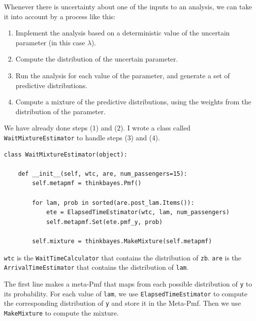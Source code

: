 \documentclass[12pt]{book}
\begin{document}
Whenever there is uncertainty about one of the inputs to an analysis,
we can take it into account by a process like this:

\begin{enumerate}

\item Implement the analysis based on a deterministic value of the
  uncertain parameter (in this case $\lambda$).

\item Compute the distribution of the uncertain parameter.

\item Run the analysis for each value of the parameter, and generate a
  set of predictive distributions.

\item Compute a mixture of the predictive distributions, using the
  weights from the distribution of the parameter.

\end{enumerate}

We have already done steps (1) and (2).  I wrote a class
called {\tt WaitMixtureEstimator} to handle steps (3) and (4).

\begin{verbatim}
class WaitMixtureEstimator(object):

    def __init__(self, wtc, are, num_passengers=15):
        self.metapmf = thinkbayes.Pmf()

        for lam, prob in sorted(are.post_lam.Items()):
            ete = ElapsedTimeEstimator(wtc, lam, num_passengers)
            self.metapmf.Set(ete.pmf_y, prob)

        self.mixture = thinkbayes.MakeMixture(self.metapmf)
\end{verbatim}

{\tt wtc} is the {\tt WaitTimeCalculator} that contains the
distribution of {\tt zb}.  {\tt are} is the {\tt ArrivalTimeEstimator}
that contains the distribution of {\tt lam}.

The first line makes a meta-Pmf that maps from each possible
distribution of {\tt y} to its probability.  For each value
of {\tt lam}, we use {\tt ElapsedTimeEstimator} to
compute the corresponding distribution of
{\tt y} and store it in the Meta-Pmf.  Then
we use {\tt MakeMixture} to compute the mixture.

\end{document}
